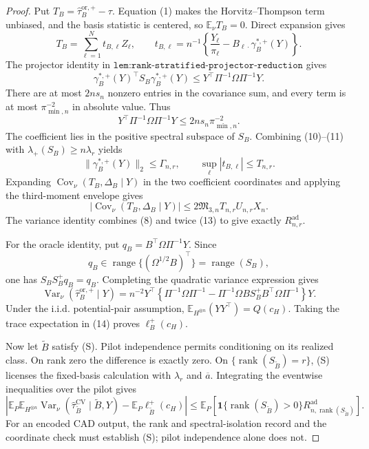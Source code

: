 \documentclass{article}
\begin{document}
\begin{proof}
Put \(T_B=\widehat\tau_B^{\mathrm{or},+}-\tau\).  Equation (1) makes the Horvitz--Thompson term unbiased, and the basis statistic is centered, so \(\mathbb E_\nu T_B=0\).  Direct expansion gives
\[
T_B=\sum_{\ell=1}^{N}t_{B,\ell}Z_\ell,
\qquad
t_{B,\ell}=n^{-1}\left\{\frac{Y_\ell}{\pi_\ell}
-B_{\ell\cdot}\gamma_B^{*,+}(Y)\right\}.
\tag{9}
\]
The projector identity in \(\texttt{lem:rank-stratified-projector-reduction}\) gives
\[
\gamma_B^{*,+}(Y)^{\top}S_B\gamma_B^{*,+}(Y)
\le Y^{\top}\Pi^{-1}\Omega\Pi^{-1}Y.
\tag{10}
\]
There are at most \(2ns_n\) nonzero entries in the covariance sum, and every term is at most \(\pi_{\min,n}^{-2}\) in absolute value.  Thus
\[
Y^{\top}\Pi^{-1}\Omega\Pi^{-1}Y
\le2ns_n\pi_{\min,n}^{-2}.
\tag{11}
\]
The coefficient lies in the positive spectral subspace of \(S_B\).  Combining (10)--(11) with \(\lambda_+(S_B)\ge n\lambda_r\) yields
\[
\lVert\gamma_B^{*,+}(Y)\rVert_2\le\Gamma_{n,r},
\qquad
\sup_\ell|t_{B,\ell}|\le T_{n,r}.
\tag{12}
\]
Expanding \(\operatorname{Cov}_\nu(T_B,\Delta_B\mid Y)\) in the two coefficient coordinates and applying the third-moment envelope gives
\[
|\operatorname{Cov}_\nu(T_B,\Delta_B\mid Y)|
\le2\mathfrak M_{3,n}T_{n,r}U_{n,r}X_n.
\tag{13}
\]
The variance identity combines (8) and twice (13) to give exactly \(R_{n,r}^{\mathrm{ad}}\).

For the oracle identity, put \(q_B=B^{\top}\Omega\Pi^{-1}Y\).  Since
\[
q_B\in\operatorname{range}\{(\Omega^{1/2}B)^{\top}\}
=\operatorname{range}(S_B),
\]
one has \(S_BS_B^+q_B=q_B\).  Completing the quadratic variance expression gives
\[
\operatorname{Var}_\nu(\widehat\tau_B^{\mathrm{or},+}\mid Y)
=n^{-2}Y^{\top}\left\{\Pi^{-1}\Omega\Pi^{-1}
-\Pi^{-1}\Omega BS_B^+B^{\top}\Omega\Pi^{-1}\right\}Y.
\tag{14}
\]
Under the i.i.d. potential-pair assumption, \(\mathbb E_{H^{\otimes n}}(YY^{\top})=Q(c_H)\).  Taking the trace expectation in (14) proves \(\ell_B^+(c_H)\).

Now let \(\widetilde B\) satisfy (S).  Pilot independence permits conditioning on its realized class.  On rank zero the difference is exactly zero.  On \(\{\operatorname{rank}(S_{\widetilde B})=r\}\), (S) licenses the fixed-basis calculation with \(\lambda_r\) and \(\overline a\).  Integrating the eventwise inequalities over the pilot gives
\[
\left|\mathbb E_P\mathbb E_{H^{\otimes n}}
\operatorname{Var}_\nu(\widehat\tau_{\widetilde B}^{\mathrm{CV}}\mid\widetilde B,Y)
-\mathbb E_P\ell_{\widetilde B}^+(c_H)\right|
\le\mathbb E_P\!\left[
\mathbf1\{\operatorname{rank}(S_{\widetilde B})>0\}
R_{n,\operatorname{rank}(S_{\widetilde B})}^{\mathrm{ad}}\right].
\tag{15}
\]
For an encoded CAD output, the rank and spectral-isolation record and the coordinate check must establish (S); pilot independence alone does not.


\end{proof}
\end{document}
